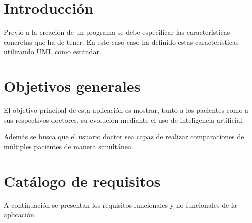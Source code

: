 

\section{Introducción}
Previo a la creación de un programa se debe especificar las características concretas que ha de tener.
En este caso caso ha definido estas características utilizando UML como estándar.



\section{Objetivos generales}
El objetivo principal de esta aplicación es mostrar, tanto a los pacientes como a sus respectivos doctores, su evolución mediante el uso de inteligencia artificial.

Además se busca que el usuario doctor sea capaz de realizar comparaciones de múltiples pacientes de manera simultánea.

\section{Catálogo de requisitos}
A continuación se presentan los requisitos funcionales y no funcionales de la aplicación.
